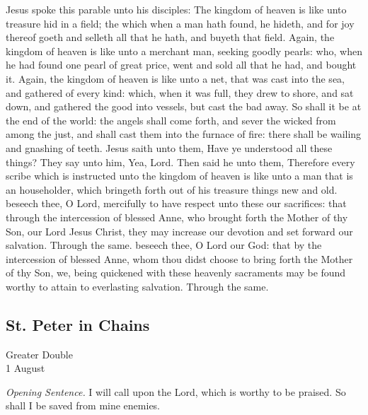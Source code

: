 Jesus spoke this parable unto his disciples: The kingdom of heaven is like unto treasure hid in a field; the which when a man hath found, he hideth, and for joy thereof goeth and selleth all that he hath, and buyeth that field. Again, the kingdom of heaven is like unto a merchant man, seeking goodly pearls: who, when he had found one pearl of great price, went and sold all that he had, and bought it. Again, the kingdom of heaven is like unto a net, that was cast into the sea, and gathered of every kind: which, when it was full, they drew to shore, and sat down, and gathered the good into vessels, but cast the bad away. So shall it be at the end of the world: the angels shall come forth, and sever the wicked from among the just, and shall cast them into the furnace of fire: there shall be wailing and gnashing of teeth. Jesus saith unto them, Have ye understood all these things? They say unto him, Yea, Lord. Then said he unto them, Therefore every scribe which is instructed unto the kingdom of heaven is like unto a man that is an householder, which bringeth forth out of his treasure things new and old.
\secret
{} beseech thee, O Lord, mercifully to have respect unto these our sacrifices: that through the intercession of blessed Anne, who brought forth the Mother of thy Son, our Lord Jesus Christ, they may increase our devotion and set forward our salvation. Through the same.
\postcommunion
{} beseech thee, O Lord our God: that by the intercession of blessed Anne, whom thou didst choose to bring forth the Mother of thy Son, we, being quickened with these heavenly sacraments may be found worthy to attain to everlasting salvation. Through the same.

\subsection{St. Peter in Chains}
\begin{inhead}
    {Greater Double\\
1 August}
\end{inhead}
\par\noindent
\textit{Opening Sentence.} I will call upon the Lord, which is worthy to be praised. So shall I be saved from mine enemies.

